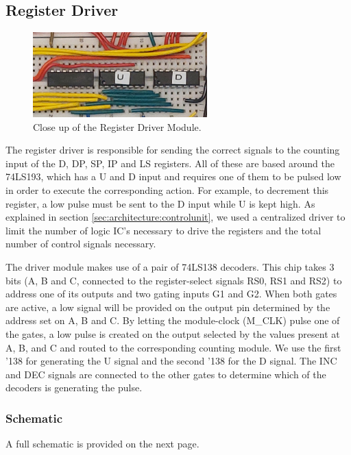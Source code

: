 \subsection{Register Driver} \label{sec:implementation:registerdriver}
\begin{figure}[H]
  \centering
  \includegraphics[width=0.6\textwidth]{img/registerdrivercloseup}
  \caption{Close up of the Register Driver Module.}
  \label{fig:registerdrivercloseup}
\end{figure}
The register driver is responsible for sending the correct signals to the counting input of the D, DP, SP, IP and LS registers. All of these are based around the 74LS193, which has a U and D input and requires one of them to be pulsed low in order to execute the corresponding action. For example, to decrement this register, a low pulse must be sent to the D input while U is kept high. As explained in section \ref{sec:architecture:controlunit}, we used a centralized driver to limit the number of logic IC's necessary to drive the registers and the total number of control signals necessary.

The driver module makes use of a pair of 74LS138 decoders. This chip takes 3 bits (A, B and C, connected to the register-select signals RS0, RS1 and RS2) to address one of its outputs and two gating inputs G1 and G2. When both gates are active, a low signal will be provided on the output pin determined by the address set on A, B and C. By letting the module-clock (M\_CLK) pulse one of the gates, a low pulse is created on the output selected by the values present at A, B, and C and routed to the corresponding counting module. We use the first '138 for generating the U signal and the second '138 for the D signal. The INC and DEC signals are connected to the other gates to determine which of the decoders is generating the pulse.

\subsubsection{Schematic}
A full schematic is provided on the next page.


